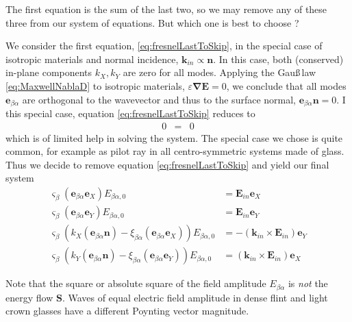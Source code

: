 \documentclass[12pt,a4paper,twoside,openright,BCOR10mm,headsepline,titlepage,abstracton,chapterprefix,final]{scrreprt}
\newcommand\Vector[1]{{\mathbf{#1}}}
\newcommand\wavenumber{k}
\newcommand\Wavevector{\Vector{\wavenumber}}
\newcommand\Nabla{\Vector{\nabla}}
\newcommand\scalarEfield{E}
\newcommand\Efield{\Vector{\scalarEfield}}
\newcommand\scalarpermittivity{\varepsilon}
\begin{document}
The first equation is the sum of the last two, so we may remove any of these three from our system of equations.
But which one is best to choose ?

We consider the first equation, \eqref{eq:fresnelLastToSkip}, in the special case of isotropic materials and normal incidence,
$\Wavevector_{in} \propto \Vector{n}$.
In this case, both (conserved) in-plane components $\wavenumber_X, \wavenumber_Y$ are zero for all modes.
Applying the Gau\ss\,law \eqref{eq:MaxwellNablaD} to isotropic materials, $\scalarpermittivity \Nabla \Efield = 0$, we conclude that 
all modes $\Vector{e}_{\beta\alpha}$ are orthogonal to the wavevector and thus to the surface normal,
$\Vector{e}_{\beta\alpha} \Vector{n} = 0$.
I this special case, equation \eqref{eq:fresnelLastToSkip} reduces to
\begin{eqnarray*}
 0 &=& 0
\end{eqnarray*}
which is of limited help in solving the system. 
The special case we chose is quite common, for example as pilot ray in all centro-symmetric systems made of glass.
Thus we decide to remove equation \eqref{eq:fresnelLastToSkip} and yield our final system
\begin{subequations}
  \begin{align}
    \varsigma_\beta (\Vector{e}_{\beta\alpha} \Vector{e}_X) E_{\beta\alpha,0} &= \Efield_{in} \Vector{e}_X \\
    \varsigma_\beta (\Vector{e}_{\beta\alpha} \Vector{e}_Y) E_{\beta\alpha,0} &= \Efield_{in} \Vector{e}_Y \\
    \varsigma_\beta \left( \wavenumber_X ( \Vector{e}_{\beta\alpha} \Vector{n} )  - \xi_{\beta\alpha} ( \Vector{e}_{\beta\alpha} \Vector{e}_X) \right) E_{\beta\alpha,0} &= -(\Wavevector_{in} \times \Efield_{in}) \Vector{e}_Y \\
    \varsigma_\beta \left( \wavenumber_Y ( \Vector{e}_{\beta\alpha} \Vector{n} )  - \xi_{\beta\alpha} ( \Vector{e}_{\beta\alpha} \Vector{e}_Y) \right) E_{\beta\alpha,0} &= (\Wavevector_{in} \times \Efield_{in}) \Vector{e}_X 
  \end{align}
\end{subequations}

Note that the square or absolute square of the field amplitude $E_{\beta\alpha}$ 
is \emph{not} the energy flow $\Vector{S}$.
Waves of equal electric field amplitude in dense flint and light crown glasses have a different Poynting vector magnitude.
\end{document}
